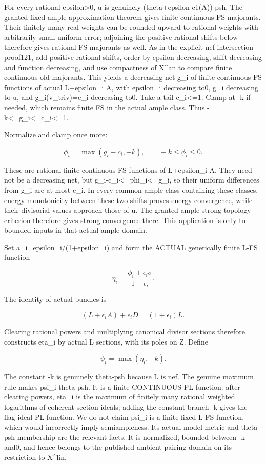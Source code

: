 \documentclass[
]{article}
\begin{document}
For every rational epsilon\textgreater0, u is genuinely (theta+epsilon
c1(A))-psh. The granted fixed-ample approximation theorem gives finite
continuous FS majorants. Their finitely many real weights can be rounded
upward to rational weights with arbitrarily small uniform error;
adjoining the positive rational shifts below therefore gives rational FS
majorants as well. As in the explicit nef intersection proof121, add
positive rational shifts, order by epsilon decreasing, shift decreasing
and function decreasing, and use compactness of X\^{}an to compare
finite continuous old majorants. This yields a decreasing net g\_i of
finite continuous FS functions of actual L+epsilon\_i A, with epsilon\_i
decreasing to0, g\_i decreasing to u, and g\_i(v\_triv)=c\_i decreasing
to0. Take a tail c\_i\textless=1. Clamp at -k if needed, which remains
finite FS in the actual ample class. Thus
-k\textless=g\_i\textless=c\_i\textless=1.

Normalize and clamp once more:

\[\phi_i=\max(g_i-c_i,-k),\qquad -k\leq\phi_i\leq0.\]

These are rational finite continuous FS functions of L+epsilon\_i A.
They need not be a decreasing net, but
g\_i-c\_i\textless=phi\_i\textless=g\_i, so their uniform differences
from g\_i are at most c\_i. In every common ample class containing these
classes, energy monotonicity between these two shifts proves energy
convergence, while their divisorial values approach those of u. The
granted ample strong-topology criterion therefore gives strong
convergence there. This application is only to bounded inputs in that
actual ample domain.

Set a\_i=epsilon\_i/(1+epsilon\_i) and form the ACTUAL generically
finite L-FS function

\[\eta_i=\frac{\phi_i+\epsilon_i\sigma}{1+\epsilon_i}.\]

The identity of actual bundles is

\[(L+\epsilon_i A)+\epsilon_i D=(1+\epsilon_i)L.\]

Clearing rational powers and multiplying canonical divisor sections
therefore constructs eta\_i by actual L sections, with its poles on Z.
Define

\[\psi_i=\max(\eta_i,-k).\tag{1}\]

The constant -k is genuinely theta-psh because L is nef. The genuine
maximum rule makes psi\_i theta-psh. It is a finite CONTINUOUS PL
function: after clearing powers, eta\_i is the maximum of finitely many
rational weighted logarithms of coherent section ideals; adding the
constant branch -k gives the flag-ideal PL function. We do not claim
psi\_i is a finite fixed-L FS function, which would incorrectly imply
semiampleness. Its actual model metric and theta-psh membership are the
relevant facts. It is normalized, bounded between -k and0, and hence
belongs to the published ambient pairing domain on its restriction to
X\^{}lin.
\end{document}
